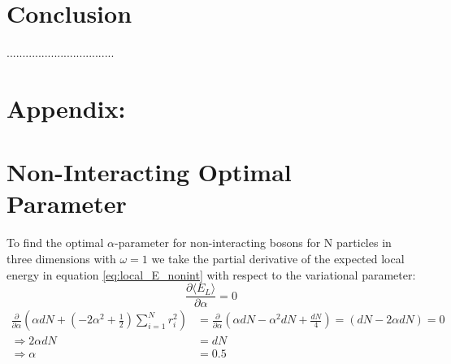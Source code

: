\documentclass[12pt,a4paper,english]{article}
\begin{document}
\section{Conclusion}
\label{sect:Conclusion}
..................................

\appendix
\section*{Appendix:}
\section{Non-Interacting Optimal Parameter}
\label{appendix:Optimal_alpha}
To find the optimal $\alpha$-parameter for non-interacting bosons for N particles in three dimensions with $\omega=1$ we take the partial derivative of the expected local energy in equation \ref{eq:local_E_nonint} with respect to the variational parameter:
\[\frac{\partial \langle E_L\rangle}{\partial \alpha}=0\]
\begin{align*}
\frac{\partial}{\partial \alpha}\left(\alpha dN+(-2\alpha^2+\frac{1}{2})\sum_{i=1}^{N}r_i^2\right)&=\frac{\partial}{\partial \alpha}\left(\alpha dN-\alpha^2dN+\frac{dN}{4}\right)=(dN-2\alpha dN)=0\\
\Rightarrow 2\alpha dN&=dN\\
\Rightarrow \alpha&=0.5
\end{align*}
\end{document}
